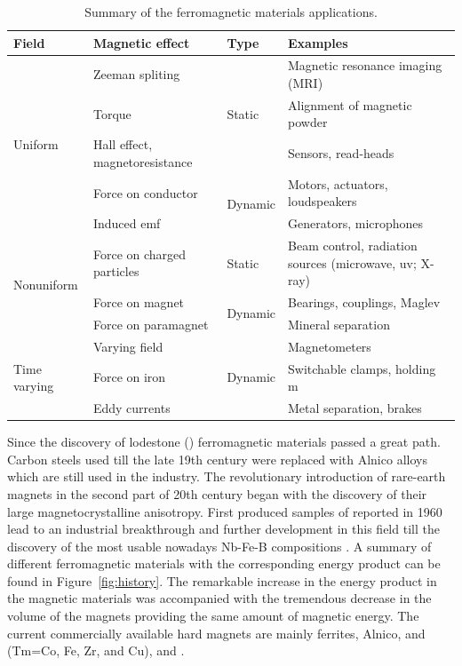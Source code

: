 \begin{table}[H]
\caption[Summary of the ferromagnetic materials applications.]{Summary of the ferromagnetic materials applications.}
\begin{tabular}{|l|l|l|p{6cm}|}
\hline 
Field & Magnetic effect & Type & Examples \\ 
\hline 
\multirow{5}{*}{Uniform} & Zeeman spliting & \multirow{3}{*}{Static} & Magnetic resonance imaging (MRI) \\ 
									 & Torque &  & Alignment of magnetic powder \\ 
 								     & Hall effect, magnetoresistance &  & Sensors, read-heads \\ \cline{2-4}
 								& Force on conductor & \multirow{2}{*}{Dynamic} & Motors, actuators, loudspeakers \\ 
 								& Induced emf &  & Generators, microphones \\ \hline 
\multirow{3}{*}{Nonuniform} & Force on charged particles & Static & Beam control, radiation sources (microwave, uv; X-ray) \\ \cline{2-4}
										   & Force on magnet &  \multirow{2}{*}{Dynamic} & Bearings, couplings, Maglev \\ 
										   & Force on paramagnet &  & Mineral separation \\ 
\hline
\multirow{3}{*}{Time varying} & Varying field & \multirow{3}{*}{Dynamic} & Magnetometers \\ 
											& Force on iron &  & Switchable clamps, holding m \\ 
											& Eddy currents &  & Metal separation, brakes \\ 
\hline 
\end{tabular}
\label{tab:application}
\end{table}
Since the discovery of lodestone () ferromagnetic materials passed a great path. Carbon steels used till the late 19th century were replaced with Alnico alloys which are still used in the industry. The revolutionary introduction of rare-earth magnets in the second part of 20th century began with the discovery of their large magnetocrystalline anisotropy. First produced samples of  reported in 1960 lead to an industrial breakthrough and further development in this field till the discovery of the most usable nowadays Nb-Fe-B compositions \cite{Gutfleisch2010}.
A summary of different ferromagnetic materials with the corresponding energy product can be found in Figure~\ref{fig:history}.
The remarkable increase in the energy product in the magnetic materials was accompanied with the tremendous decrease in the volume of the magnets providing the same amount of magnetic energy.
The current
commercially available hard magnets are mainly ferrites, Alnico,  and
 (Tm=Co, Fe, Zr, and Cu),  and .

